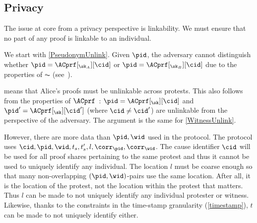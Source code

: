 \subsection{Privacy}

The issue at core from a privacy perspective is linkability.
We must ensure that no part of any proof is linkable to an individual.

We start with \cref{PseudonymUnlink}.
Given \(\pid\), the adversary cannot distinguish whether \(\pid = 
  \ACprf[_{\sk_A}][\cid]\) or \(\pid = \ACprf[_{\sk_B}][\cid]\) due to the 
properties of \(\AC\) (see~\cite{HowToWinTheCloneWars}).

 means that Alice's proofs must be unlinkable across 
protests.
This also follows from the properties of 
\(\ACprf\)~\cite{HowToWinTheCloneWars}: \(\pid =  \ACprf[_{\sk}][\cid]\) and 
\(\pid' = \ACprf[_{\sk}][\cid']\) (where \(\cid \neq \cid'\)) are unlinkable 
from the perspective of the adversary.
The argument is the same for \cref{WitnessUnlink}.

However, there are more data than \(\pid, \wid\) used in the protocol.
The protocol uses \(\cid, \pid, \wid, t_s, t_s', l, \corr_{\pid}, 
\corr_{\wid}\).
The cause identifier \(\cid\) will be used for all proof shares
pertaining to the same protest and thus it cannot be used to uniquely
identify any individual. The location \(l\) must be coarse enough so that many 
non-overlapping \((\pid, \wid)\)-pairs use the same location.
After all, it is the location of the protest, not the location within the 
protest that matters.
Thus \(l\) can be made to not uniquely identify any individual protester or 
witness.
Likewise, thanks to the constraints in the time-stamp granularity 
(\cref{timestamp}), \(t\) can be made to not uniquely identify either.

